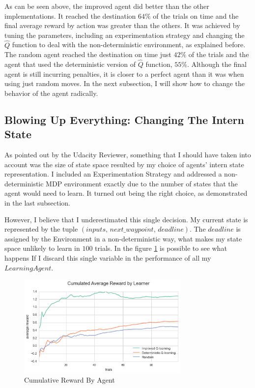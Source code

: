 \documentclass[a4paper]{article}
\begin{document}
As can be seen above, the improved agent did better than the other implementations. It reached the destination $64\%$ of the trials on time and the final average reward by action was greater than the others. It was achieved by tuning the parameters, including an experimentation strategy and changing the $\hat{Q}$ function to deal with the non-deterministic environment, as explained before. The random agent reached the destination on time just $42\%$ of the trials and the agent that used the deterministic version of $\hat{Q}$ function, $55\%$. Although the final agent is still incurring penalties, it is closer to a perfect agent than it was when using just random moves. In the next subsection, I will show how to change the behavior of the agent radically.

\subsection{Blowing Up Everything: Changing The Intern State}
As pointed out by the Udacity Reviewer, something that I should have taken into account was the size of state space resulted by my choice of agents' intern state representation. I included an Experimentation Strategy and addressed a non-deterministic MDP environment exactly due to the number of states that the agent would need to learn. It turned out being the right choice, as demonstrated in the last subsection.

However, I believe that I underestimated this single decision. My current state is represented by the tuple $(inputs,\, next\_waypoint,\, deadline)$. The $deadline$ is assigned by the Environment in a non-deterministic way, what makes my state space unlikely to learn in $100$ trials. In the figure \ref{fig:perf_compr_2} is possible to see what happens If I discard this single variable in the performance of all my $LearningAgent$.

\begin{figure}[ht!]
\centering
\includegraphics[width=0.75\textwidth]{images/performance_comparition_2.png}
\caption{\label{fig:perf_compr_2}Cumulative Reward By Agent}
\end{figure}
\end{document}
